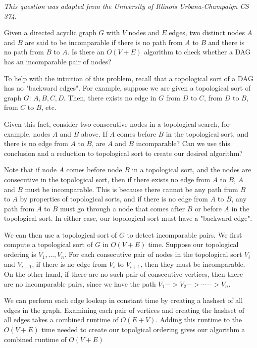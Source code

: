\question \emph{This question was adapted from the University of Illinois Urbana-Champaign CS 374.}

Given a directed acyclic graph $G$ with $V$ nodes and $E$ edges, two distinct nodes $A$ and $B$ are said to be incomparable if there is no path from $A$ to $B$ and there is no path from $B$ to $A$. Is there an $O(V+E)$ algorithm to check whether a DAG has an incomparable pair of nodes?

To help with the intuition of this problem, recall that a topological sort of a DAG has no "backward edges". For example, suppose we are given a topological sort of graph $G$: $A, B, C, D$. Then, there exists no edge in $G$ from $D$ to $C$, from $D$ to $B$, from $C$ to $B$, etc.

Given this fact, consider two consecutive nodes in a topological search, for example, nodes $A$ and $B$ above. If $A$ comes before $B$ in the topological sort, and there is no edge from $A$ to $B$, are $A$ and $B$ incomparable? Can we use this conclusion and a reduction to topological sort to create our desired algorithm?

\begin{solution}
Note that if node $A$ comes before node $B$ in a topological sort, and the nodes are consecutive in the topological sort, then if there exists no edge from $A$ to $B$, $A$ and $B$ must be incomparable. This is because there cannot be any path from $B$ to $A$ by properties of topological sorts, and if there is no edge from $A$ to $B$, any path from $A$ to $B$ must go through a node that comes after $B$ or before $A$ in the topological sort. In either case, our topological sort must have a "backward edge".

We can then use a topological sort of $G$ to detect incomparable pairs. We first compute a topological sort of $G$ in $O(V+E)$ time. Suppose our topological ordering is $V_1, \ldots, V_n$. For each consecutive pair of nodes in the topological sort $V_{i}$ and $V_{i+1}$, if there is no edge from $V_{i}$ to $V_{i+1}$, then they must be incomparable. On the other hand, if there are no such pair of consecutive vertices, then there are no incomparable pairs, since we have the path $V_1 -> V_2 -> \cdots -> V_n$. 

We can perform each edge lookup in constant time by creating a hashset of all edges in the graph. Examining each pair of vertices and creating the hashset of all edges takes a combined runtime of $O(E+V)$. Adding this runtime to the $O(V+E)$ time needed to create our topolgical ordering gives our algorithm a combined runtime of $O(V+E)$
\end{solution}
